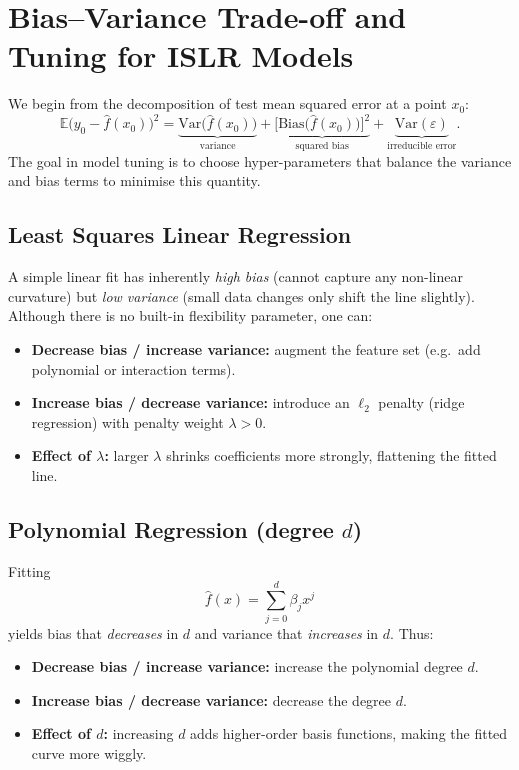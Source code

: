 \documentclass{article}
\begin{document}
\pagebreak




\section{Bias–Variance Trade-off and Tuning for ISLR Models}

We begin from the decomposition of test mean squared error at a point \(x_0\):
\[
\mathbb{E}\bigl(y_0 - \hat f(x_0)\bigr)^2
= \underbrace{\mathrm{Var}\bigl(\hat f(x_0)\bigr)}_{\text{variance}}
+ \underbrace{\bigl[\mathrm{Bias}\bigl(\hat f(x_0)\bigr)\bigr]^2}_{\text{squared bias}}
+ \underbrace{\mathrm{Var}(\varepsilon)}_{\text{irreducible error}}.
\]
The goal in model tuning is to choose hyper-parameters that balance the variance and bias terms to minimise this quantity.

\bigskip
\subsection{Least Squares Linear Regression}
A simple linear fit has inherently \emph{high bias} (cannot capture any non-linear curvature) but \emph{low variance} (small data changes only shift the line slightly).  Although there is no built-in flexibility parameter, one can:
\begin{itemize}
  \item \textbf{Decrease bias / increase variance:} augment the feature set (e.g.\ add polynomial or interaction terms).
  \item \textbf{Increase bias / decrease variance:} introduce an \(\ell_2\) penalty (ridge regression) with penalty weight \(\lambda>0\).
  \item \textbf{Effect of \(\lambda\):} larger \(\lambda\) shrinks coefficients more strongly, flattening the fitted line.
\end{itemize}

\subsection{Polynomial Regression (degree \(d\))}
Fitting 
\[
\hat f(x) = \sum_{j=0}^d \beta_j x^j
\]
yields bias that \emph{decreases} in \(d\) and variance that \emph{increases} in \(d\).  Thus:
\begin{itemize}
  \item \textbf{Decrease bias / increase variance:} increase the polynomial degree \(d\).
  \item \textbf{Increase bias / decrease variance:} decrease the degree \(d\).
  \item \textbf{Effect of \(d\):} increasing \(d\) adds higher-order basis functions, making the fitted curve more wiggly.
\end{itemize}
\end{document}

